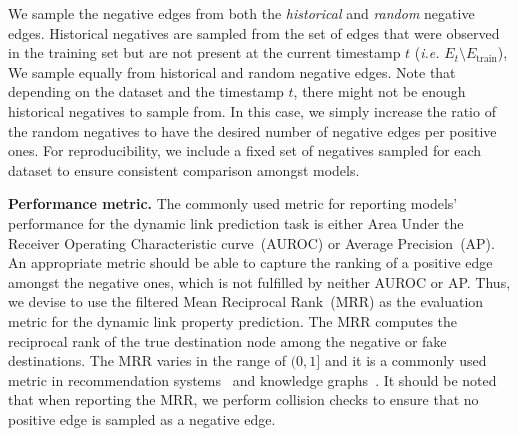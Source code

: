 We sample the negative edges from both the \emph{historical} and \emph{random} negative edges. 
Historical negatives are sampled from the set of edges that were observed in the training set but are not present at the current timestamp $t$ (\emph{i.e.} $E_{t} \setminus E_\text{train}$), 
We sample equally from historical and random negative edges. Note that depending on the dataset and the timestamp $t$, there might not be enough historical negatives to sample from. In this case, we simply increase the ratio of the random negatives to have the desired number of negative edges per positive ones.
For reproducibility, we include a fixed set of negatives sampled for each dataset to ensure consistent comparison amongst models.

\textbf{Performance metric.} The commonly used metric for reporting models' performance for the dynamic link prediction task is either Area Under the Receiver Operating Characteristic curve~(AUROC) or Average Precision~(AP). 
An appropriate metric should be able to capture the ranking of a positive edge amongst the negative ones, which is not fulfilled by neither AUROC or AP.
Thus, 
we devise to use the filtered Mean Reciprocal Rank~(MRR) as the evaluation metric for the dynamic link property prediction. 
The MRR computes the reciprocal rank of the true destination node among the negative or fake destinations. 
The MRR varies in the range of $(0,1]$ and it is a commonly used metric in recommendation systems~\cite{wu2022graph} and knowledge graphs~\cite{wang2022interht,hu2020open,hu2021ogb}.  It should be noted that when reporting the MRR, we perform collision checks to ensure that no positive edge is sampled as a negative edge. 



